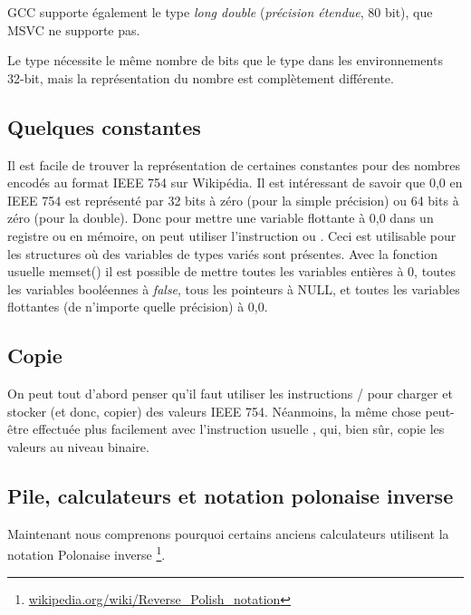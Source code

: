 GCC supporte également le type \emph{long double} (\emph{précision étendue}\FNURLEP,
80 bit), que MSVC ne supporte pas.

Le type \Tfloat nécessite le même nombre de bits que le type \Tint dans les environnements
32-bit, mais la représentation du nombre est complètement différente.





\subsection{Quelques constantes}

Il est facile de trouver la représentation de certaines constantes pour des nombres
encodés au format IEEE 754 sur Wikipédia.
Il est intéressant de savoir que 0,0 en IEEE 754 est représenté par 32 bits à zéro
(pour la simple précision) ou 64 bits à zéro (pour la double).
Donc pour mettre une variable flottante à 0,0 dans un registre ou en mémoire, on
peut utiliser l'instruction \MOV ou .
Ceci est utilisable pour les structures où des variables de types variés sont présentes.
Avec la fonction usuelle memset() il est possible de mettre toutes les variables
entières à 0, toutes les variables booléennes à \emph{false}, tous les pointeurs à
NULL, et toutes les variables flottantes (de n'importe quelle précision) à 0,0.

\subsection{Copie}

On peut tout d'abord penser qu'il faut utiliser les instructions /
pour charger et stocker (et donc, copier) des valeurs IEEE 754.
Néanmoins, la même chose peut-être effectuée plus facilement avec l'instruction usuelle
, qui, bien sûr, copie les valeurs au niveau binaire.

\subsection{Pile, calculateurs et notation polonaise inverse}


Maintenant nous comprenons pourquoi certains anciens calculateurs utilisent la notation
Polonaise inverse
\footnote{\href{http://go.yurichev.com/17354}{wikipedia.org/wiki/Reverse\_Polish\_notation}}.

